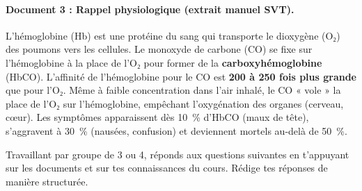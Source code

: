 \documentclass[11pt]{article}
\newcounter{popsec}
\newcounter{popsub}
\newcommand{\courssub}[1]{%
  \stepcounter{popsub}%
  \par\vspace{9pt}\noindent{\popxbold\fontsize{11.5}{13}\selectfont\color{popink}{\color{poporange}\thepopsec.\thepopsub}\hspace{6pt}#1}\par\nopagebreak\vspace{4pt}
}
\begin{document}
\paragraph{Document 3 : Rappel physiologique (extrait manuel SVT).}
L'hémoglobine (Hb) est une protéine du sang qui transporte le dioxygène (O₂) des poumons vers les cellules. Le monoxyde de carbone (CO) se fixe sur l'hémoglobine à la place de l'O₂ pour former de la \textbf{carboxyhémoglobine} (HbCO). L'affinité de l'hémoglobine pour le CO est \textbf{200 à 250 fois plus grande} que pour l'O₂. Même à faible concentration dans l'air inhalé, le CO « vole » la place de l'O₂ sur l'hémoglobine, empêchant l'oxygénation des organes (cerveau, cœur). Les symptômes apparaissent dès \SI{10}{\percent} d'HbCO (maux de tête), s'aggravent à \SI{30}{\percent} (nausées, confusion) et deviennent mortels au-delà de \SI{50}{\percent}.

\courssub{Consignes}
Travaillant par groupe de 3 ou 4, réponds aux questions suivantes en t'appuyant sur les documents et sur tes connaissances du cours. Rédige tes réponses de manière structurée.
\end{document}

